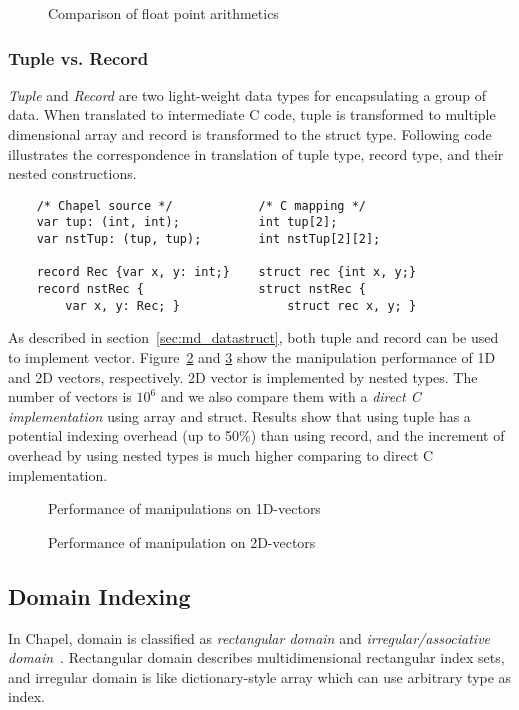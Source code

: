 \begin{figure}[t]
\centering

\caption{Comparison of float point arithmetics}
\label{fig:arith}
\end{figure}

\subsubsection{Tuple vs. Record}\label{sec:tuple_record}
{\em Tuple} and {\em Record} are two light-weight data types for encapsulating a
group of data. When translated to intermediate C code, tuple is transformed to
multiple dimensional array and record is transformed to the {\ic struct} type.
Following code illustrates the correspondence in translation of {\ic tuple}
type, {\ic record} type, and their nested constructions.

\begin{lstlisting}
    /* Chapel source */            /* C mapping */
    var tup: (int, int);           int tup[2];
    var nstTup: (tup, tup);        int nstTup[2][2];

    record Rec {var x, y: int;}    struct rec {int x, y;}
    record nstRec {                struct nstRec {
        var x, y: Rec; }               struct rec x, y; }
\end{lstlisting}

As described in section~\ref{sec:md_datastruct}, both {\ic tuple} and {\ic
record} can be used to implement vector. Figure~\ref{fig:1d_vector} and
\ref{fig:2d_vector} show the manipulation performance of 1D and 2D vectors,
respectively. 2D vector is implemented by nested types. The number of vectors is
$10^6$ and we also compare them with a {\em direct C implementation} using array
and {\ic struct}. Results show that using {\ic tuple} has a potential indexing
overhead (up to 50\%) than using {\ic record}, and the increment of overhead by
using nested types is much higher comparing to direct C implementation.

\begin{figure}[t]
\centering

\caption{Performance of manipulations on 1D-vectors}
\label{fig:1d_vector}
\end{figure}

\begin{figure}[t]
\centering

\caption{Performance of manipulation on 2D-vectors}
\label{fig:2d_vector}
\end{figure}

\subsection{Domain Indexing}
In Chapel, domain is classified as {\em rectangular domain} and {\em
irregular/associative domain}~\cite{chapelspec}. Rectangular domain describes
multidimensional rectangular index sets, and irregular domain is like
dictionary-style array which can use arbitrary type as index.

